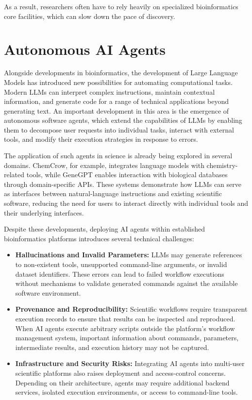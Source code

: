 As a result, researchers often have to rely heavily on specialized bioinformatics core facilities, which can slow down the pace of discovery.

\section{Autonomous AI Agents}
\label{sec:ai_agents}

Alongside developments in bioinformatics, the development of Large Language Models has introduced new possibilities for automating computational tasks. Modern LLMs can interpret complex instructions, maintain contextual information, and generate code for a range of technical applications beyond generating text. An important development in this area is the emergence of autonomous software agents, which extend the capabilities of LLMs by enabling them to decompose user requests into individual tasks, interact with external tools, and modify their execution strategies in response to errors.

The application of such agents in science is already being explored in several domains. ChemCrow, for example, integrates language models with chemistry-related tools, while GeneGPT enables interaction with biological databases through domain-specific APIs. These systems demonstrate how LLMs can serve as interfaces between natural-language instructions and existing scientific software, reducing the need for users to interact directly with individual tools and their underlying interfaces.

Despite these developments, deploying AI agents within established bioinformatics platforms introduces several technical challenges:

\begin{itemize} \item \textbf{Hallucinations and Invalid Parameters:} LLMs may generate references to non-existent tools, unsupported command-line arguments, or invalid dataset identifiers. These errors can lead to failed workflow executions without mechanisms to validate generated commands against the available software environment.

\item \textbf{Provenance and Reproducibility:} Scientific workflows require transparent execution records to ensure that results can be inspected and reproduced. When AI agents execute arbitrary scripts outside the platform's workflow management system, important information about commands, parameters, intermediate results, and execution history may not be captured.

\item \textbf{Infrastructure and Security Risks:} Integrating AI agents into multi-user scientific platforms also raises deployment and access-control concerns. Depending on their architecture, agents may require additional backend services, isolated execution environments, or access to command-line tools. \end{itemize}

